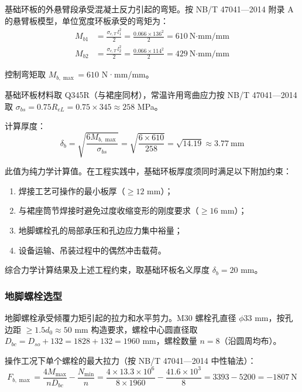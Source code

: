 基础环板的外悬臂段承受混凝土反力引起的弯矩。按 NB/T 47041—2014 附录 A 的悬臂板模型，单位宽度环板承受的弯矩为：
\begin{align}
M_{b1} &= \frac{\sigma_{c,T}\, l_1^2}{2} = \frac{0.066 \times 136^2}{2} = 610\ \text{N·mm/mm} \\
M_{b2} &= \frac{\sigma_{c,T}\, l_2^2}{2} = \frac{0.066 \times 114^2}{2} = 429\ \text{N·mm/mm}
\end{align}

控制弯矩取 $M_{b,\max} = 610$ N·mm/mm。

基础环板材料取 Q345R（与裙座同材），常温许用弯曲应力按 NB/T 47041—2014 取 $\sigma_{bs} = 0.75 R_{eL} = 0.75 \times 345 \approx 258$ MPa。

计算厚度：
\begin{equation}
\delta_b = \sqrt{\frac{6 M_{b,\max}}{\sigma_{bs}}} = \sqrt{\frac{6 \times 610}{258}} = \sqrt{14.19} \approx 3.77\ \text{mm}
\end{equation}

此值为纯力学计算值。在工程实践中，基础环板厚度须同时满足以下附加约束：
\begin{enumerate}
    \item 焊接工艺可操作的最小板厚（$\ge 12$ mm）；
    \item 与裙座筒节焊接时避免过度收缩变形的刚度要求（$\ge 16$ mm）；
    \item 地脚螺栓孔的局部承压和孔边应力集中裕量；
    \item 设备运输、吊装过程中的偶然冲击载荷。
\end{enumerate}

综合力学计算结果及上述工程约束，取基础环板名义厚度 $\delta_b = 20$ mm。

\subsubsection{地脚螺栓选型}

地脚螺栓承受倾覆力矩引起的拉力和水平剪力。M30 螺栓孔直径 $\phi 33$ mm，按孔边距 $\ge 1.5d_0 \approx 50$ mm 构造要求，螺栓中心圆直径取 $D_{bc} = D_{so} + 132 = 1828 + 132 = 1960$ mm，螺栓数量 $n = 8$（沿圆周均布）。

操作工况下单个螺栓的最大拉力（按 NB/T 47041—2014 中性轴法）：
\begin{equation}
F_{b,\max} = \frac{4M_{\max}}{n D_{bc}} - \frac{N_{\min}}{n}
            = \frac{4 \times 13.3 \times 10^6}{8 \times 1960} - \frac{41.6 \times 10^3}{8}
            = 3393 - 5200 = -1807\ \text{N}
\end{equation}

